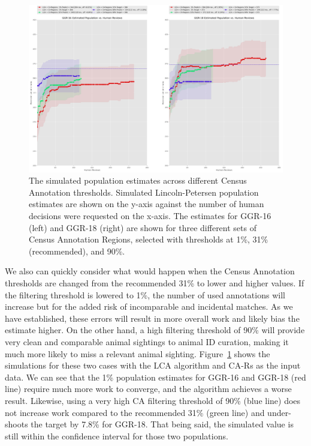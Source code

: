 \begin{figure}[!t]
    \begin{center}
        \includegraphics[width=0.9\linewidth]{resources/lca-decisions-harsh-lax-1.pdf}
    \end{center}
    \caption{The simulated population estimates across different Census Annotation thresholds.  Simulated Lincoln-Petersen population estimates are shown on the y-axis against the number of human decisions were requested on the x-axis.  The estimates for GGR-16 (left) and GGR-18 (right) are shown for three different sets of Census Annotation Regions, selected with thresholds at 1\%, 31\% (recommended), and 90\%.}
    \label{fig:ca-sim-harsh-lax}
\end{figure}

We also can quickly consider what would happen when the Census Annotation thresholds are changed from the recommended 31\% to lower and higher values.  If the filtering threshold is lowered to 1\%, the number of used annotations will increase but for the added risk of incomparable and incidental matches.  As we have established, these errors will result in more overall work and likely bias the estimate higher.  On the other hand, a high filtering threshold of 90\% will provide very clean and comparable animal sightings to animal ID curation, making it much more likely to miss a relevant animal sighting.  Figure~\ref{fig:ca-sim-harsh-lax} shows the simulations for these two cases with the LCA algorithm and CA-Rs as the input data.  We can see that the 1\% population estimates for GGR-16 and GGR-18 (red line) require much more work to converge, and the algorithm achieves a worse result.  Likewise, using a very high CA filtering threshold of 90\% (blue line) does not increase work compared to the recommended 31\% (green line) and under-shoots the target by 7.8\% for GGR-18.  That being said, the simulated value is still within the confidence interval for those two populations.

